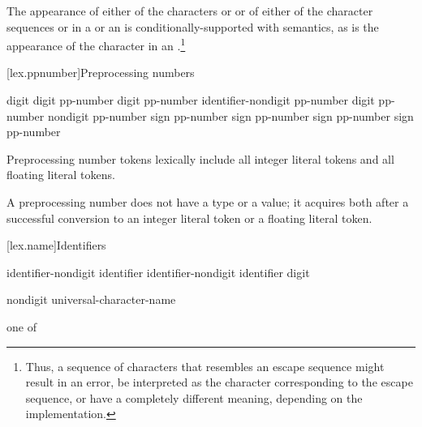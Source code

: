 \pnum
The appearance of either of the characters  or \tcode{\textbackslash} or of
either of the character sequences \tcode{/*} or \tcode{//} in a
 or an 
is conditionally-supported with  semantics, as is the appearance of the character
 in an .\footnote{Thus, a sequence of characters
that resembles an escape sequence might result in an error, be interpreted as the
character corresponding to the escape sequence, or have a completely different meaning,
depending on the implementation.}%

[lex.ppnumber]{Preprocessing numbers}

%
\begin{bnf}
\br
    digit\br
     digit\br
    pp-number digit\br
    pp-number identifier-nondigit\br
    pp-number  digit\br
    pp-number  nondigit\br
    pp-number  sign\br
    pp-number  sign\br
    pp-number  sign\br
    pp-number  sign\br
    pp-number 
\end{bnf}

\pnum
Preprocessing number tokens lexically include all integer literal
tokens and all floating literal
tokens.

\pnum
A preprocessing number does not have a type or a value; it acquires both
after a successful conversion to an integer literal token or a floating literal
token.%

[lex.name]{Identifiers}

%
\begin{bnf}
\br
    identifier-nondigit\br
    identifier identifier-nondigit\br
    identifier digit
\end{bnf}

\begin{bnf}
\br
    nondigit\br
    universal-character-name
\end{bnf}

\begin{bnf}
 \textnormal{one of}\br
    \br
    \br
    \br
\end{bnf}

